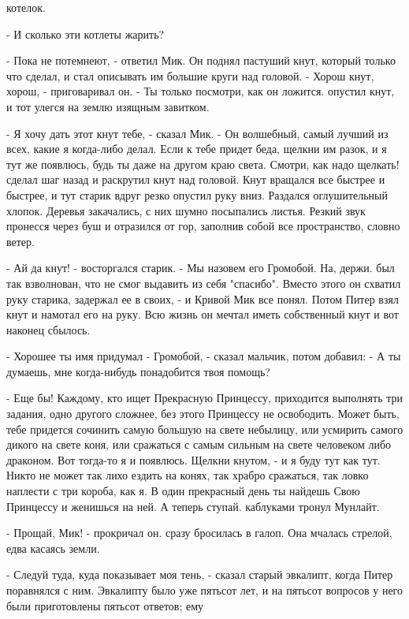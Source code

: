 котелок.
\par- И сколько эти котлеты жарить?
\par- Пока не потемнеют, - ответил Мик. Он поднял пастуший кнут, 
который только что сделал, и стал описывать им большие круги над 
головой. - Хорош кнут, хорош, - приговаривал он. - Ты только посмотри, 
как он ложится.
 опустил кнут, и тот улегся на землю изящным завитком.
\par- Я хочу дать этот кнут тебе, - сказал Мик. - Он волшебный, самый 
лучший из всех, какие я когда-либо делал. Если к тебе придет беда, 
щелкни им разок, и я тут же появлюсь, будь ты даже на другом краю 
света. Смотри, как надо щелкать!
 сделал шаг назад и раскрутил кнут над головой. Кнут вращался 
все быстрее и быстрее, и тут старик вдруг резко опустил руку вниз. 
Раздался оглушительный хлопок. Деревья закачались, с них шумно 
посыпались листья. Резкий звук пронесся через буш и отразился от гор, 
заполнив собой все пространство, словно ветер.
\par- Ай да кнут! - восторгался старик. - Мы назовем его Громобой. На, 
держи.
 был так взволнован, что не смог выдавить из себя "спасибо". 
Вместо этого он схватил руку старика, задержал ее в своих, - и Кривой 
Мик все понял. Потом Питер взял кнут и намотал его на руку. Всю жизнь 
он мечтал иметь собственный кнут и вот наконец сбылось.
\par- Хорошее ты имя придумал - Громобой, - сказал мальчик, потом 
добавил: - А ты думаешь, мне когда-нибудь понадобится твоя помощь?
\par- Еще бы! Каждому, кто ищет Прекрасную Принцессу, приходится 
выполнять три задания, одно другого сложнее, без этого Принцессу не 
освободить. Может быть, тебе придется сочинить самую большую на свете 
небылицу, или усмирить самого дикого на свете коня, или сражаться с 
самым сильным на свете человеком либо драконом. Вот тогда-то я и 
появлюсь. Щелкни кнутом, - и я буду тут как тут. Никто не может так 
лихо ездить на конях, так храбро сражаться, так ловко наплести с три 
короба, как я. В один прекрасный день ты найдешь Свою Принцессу и 
женишься на ней. А теперь ступай.
 каблуками тронул Мунлайт.
\par- Прощай, Мик! - прокричал он.
 сразу бросилась в галоп. Она мчалась стрелой, едва касаясь 
земли.
\par- Следуй туда, куда показывает моя тень, - сказал старый эвкалипт, 
когда Питер поравнялся с ним. Эвкалипту было уже пятьсот лет, и на 
пятьсот вопросов у него были приготовлены пятьсот ответов; ему 
